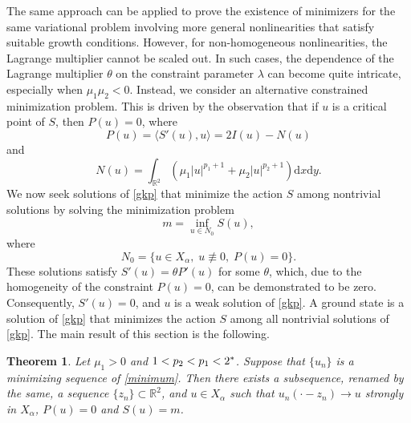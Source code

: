 \documentclass[10pt]{article}
\numberwithin{equation}{section}
\newtheorem{theorem}{\quad Theorem}[section]
\newtheorem{remark}[theorem]{\quad Remark}
\newcommand{\mo}{\mu_1}  \newcommand{\po}{{p_1}}
\newcommand{\al}{\alpha}
\newcommand{\rt}{{\mathbb{R}^2}}
\begin{document}
	The same approach can be applied to prove the existence of minimizers for the same variational problem involving more general nonlinearities that satisfy suitable growth conditions. However, for non-homogeneous nonlinearities, the Lagrange multiplier cannot be scaled out. In such cases, the dependence of the Lagrange multiplier \(\theta\) on the constraint parameter \(\lambda\) can become quite intricate, especially when \(\mu_1 \mu_2 < 0\). Instead, we consider an alternative constrained minimization problem. This is driven by the observation that if \(u\) is a critical point of \(S\), then \(P(u) = 0\), where
	\[
	P(u)=\langle S'(u),u\rangle=2I(u)-N(u)
	\]
	and
	\[
	N(u)=\int_{\mathbb{R}^2}\left(\mu_1 |u|^{p_1+1}+\mu_2 |u|^{p_2+1}\right)\mathrm{d}x\mathrm{d}y.
	\]
	We now seek solutions of \eqref{gkp} that minimize the action \(S\) among nontrivial solutions by solving the minimization problem
	\begin{equation}\label{minimum}
		m=\inf_{u\in N_0}S(u),
	\end{equation}
	where
	\[
	N_0=\{u\in X_\alpha,\;u\not\equiv0,\;P(u)=0\}.
	\]
	These solutions satisfy \(S'(u) =\theta P'(u)\) for some \(\theta\), which, due to the homogeneity of the constraint \(P(u) = 0\), can be demonstrated to be zero. Consequently, \(S'(u) = 0\), and $u$ is a weak solution of \eqref{gkp}. A ground state is a solution of \eqref{gkp} that minimizes the action \(S\) among all nontrivial solutions of \eqref{gkp}. The main result of this section is the following. 
	
	\begin{theorem}\label{theorem-exist}
		Let $\mo>0$ and $1<\poo<\po<2^\ast$.	Suppose that $\{u_n\}$ is a minimizing sequence  of \eqref{minimum}. Then there exists a subsequence, renamed by the same, a sequence $\{z_n\}\subset\rt$, and $u\in X_\al$ such that $u_n(\cdot-z_n)\to u$ strongly in $X_\al$, $P(u)=0$ and $S(u)=m$.
	\end{theorem}
	
\end{document}
